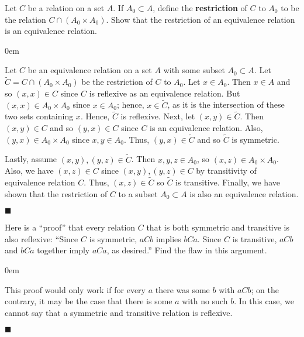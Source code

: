 \documentclass[12pt]{article}
\renewcommand{\qed}{\hfill$\blacksquare$}
\renewenvironment{proof}{\begin{addmargin}[1em]{0em}\begin{newproof}}{\end{newproof}\end{addmargin}\qed}
\newenvironment{problem}[2][Exercise]{\begin{trivlist}
\item[\hskip \labelsep {\bfseries #1}\hskip \labelsep {\bfseries #2.}]}{\end{trivlist}}
\begin{document}
\begin{problem}{1.3.2}
Let $C$ be a relation on a set $A$. If $A_0 \subset A$, define the \textbf{restriction} of $C$ to $A_0$ to be the relation $C\cap \left(A_0 \times A_0\right)$. Show that the restriction of an equivalence relation is an equivalence relation.
\end{problem}
\begin{proof}
Let $C$ be an equivalence relation on a set $A$ with some subset $A_0 \subset A$. Let $\tilde{C} = C\cap \left(A_0 \times A_0\right)$ be the restriction of $C$ to $A_0$. Let $x \in A_0$. Then $x \in A$ and so $\left(x,x\right) \in C$ since $C$ is reflexive as an equivalence relation. But $\left(x,x\right) \in A_0 \times A_0$ since $x \in A_0$; hence, $x \in \tilde{C}$, as it is the intersection of these two sets containing $x$. Hence, $\tilde{C}$ is reflexive. Next, let $\left(x,y\right) \in \tilde{C}$. Then $\left(x,y\right) \in C$ and so $\left(y,x\right) \in C$ since $C$ is an equivalence relation. Also, $\left(y,x\right) \in A_0 \times A_0$ since $x,y \in A_0$. Thus, $\left(y,x\right) \in \tilde{C}$ and so $\tilde{C}$ is symmetric.

Lastly, assume $\left(x,y\right), \left(y,z\right) \in \tilde{C}$. Then $x,y,z \in A_0$, so $\left(x,z\right) \in A_0\times A_0$. Also, we have $\left(x,z\right) \in C$ since $\left(x,y\right), \left(y,z\right) \in C$ by transitivity of equivalence relation $C$. Thus, $\left(x,z\right) \in \tilde{C}$ so $\tilde{C}$ is transitive. Finally, we have shown that the restriction of $C$ to a subset $A_0 \subset A$ is also an equivalence relation.
\end{proof}


\begin{problem}{1.3.3}
Here is a ``proof'' that every relation $C$ that is both symmetric and transitive is also reflexive: ``Since $C$ is symmetric, $aCb$ implies $bCa$. Since $C$ is transitive, $aCb$ and $bCa$ together imply $aCa$, as desired.'' Find the flaw in this argument.
\end{problem}
\begin{proof}
This proof would only work if for every $a$ there was some $b$ with $aCb$; on the contrary, it may be the case that there is some $a$ with no such $b$. In this case, we cannot say that a symmetric and transitive relation is reflexive.
\end{proof}
\end{document}
